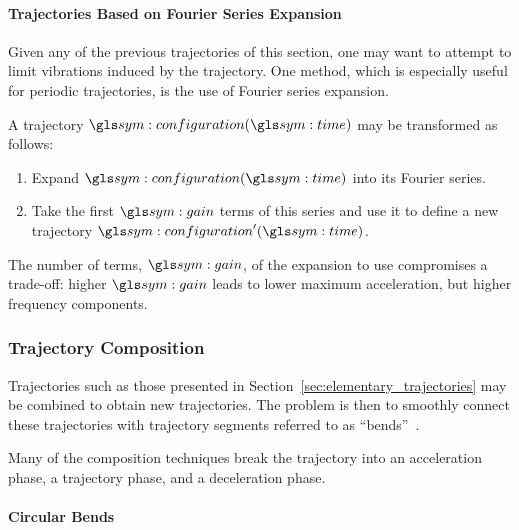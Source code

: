 			\paragraph{Trajectories Based on Fourier Series Expansion}%
			\label{trajectories_based_on_fourier_series_expansion}

				Given any of the previous trajectories of this section, one may
				want to attempt to limit vibrations induced by the trajectory.
				One method, which is especially useful for periodic
				trajectories, is the use of Fourier series expansion.

				A trajectory $\configuration(\timesym)$ may be transformed as
				follows:

				\begin{enumerate}

					\item

						Expand $\configuration(\timesym)$ into its Fourier
						series.

					\item

						Take the first $\gain$ terms of this series and use it to
						define a new trajectory $\configuration'(\timesym)$.

				\end{enumerate}

				The number of terms, $\gain$, of the expansion to use
				compromises a trade-off: higher $\gain$ leads to lower maximum
				acceleration, but higher frequency components.

		\subsubsection{Trajectory Composition}%
		\label{sec:trajetory_composition}

			Trajectories such as those presented in
			Section~\ref{sec:elementary_trajectories} may be combined to obtain
			new trajectories. The problem is then to smoothly connect these
			trajectories with trajectory segments referred to as
			``bends''~\cite{bib:traj:trajectory_planning_for_automatic_machines_and_robots}.

			Many of the composition techniques break the trajectory into an
			acceleration phase, a trajectory phase, and a deceleration phase.

			\paragraph{Circular Bends}%
			\label{circular_bends}


